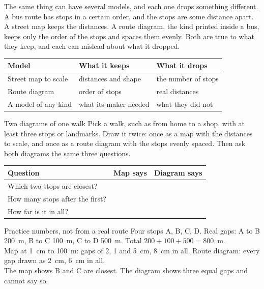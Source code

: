 \label{ch4}

The same thing can have several models, and each one drops something different. A bus route has stops in a certain order, and the stops are some distance apart. A street map keeps the distances. A route diagram, the kind printed inside a bus, keeps only the order of the stops and spaces them evenly. Both are true to what they keep, and each can mislead about what it dropped.

\begin{center}
\sffamily\small\renewcommand{\arraystretch}{1.5}
\begin{tabular}{@{}p{3.4cm}p{3.7cm}p{3.7cm}@{}}
\toprule
\textbf{Model} & \textbf{What it keeps} & \textbf{What it drops}\\
\midrule
Street map to scale & distances and shape & the number of stops\\
Route diagram & order of stops & real distances\\
A model of any kind & what its maker needed & what they did not\\
\bottomrule
\end{tabular}
\end{center}

\begin{tryit}{Two diagrams of one walk}
Pick a walk, such as from home to a shop, with at least three stops or landmarks. Draw it twice: once as a map with the distances to scale, and once as a route diagram with the stops evenly spaced. Then ask both diagrams the same three questions.\par\medskip
\renewcommand{\arraystretch}{1.8}
\begin{tabular}{|p{4.0cm}|p{2.5cm}|p{2.5cm}|}
\hline
\textbf{Question} & \textbf{Map says} & \textbf{Diagram says}\\ \hline
Which two stops are closest? & & \\ \hline
How many stops after the first? & & \\ \hline
How far is it in all? & & \\ \hline
\end{tabular}
\end{tryit}

\begin{worked}{Practice numbers, not from a real route}
Four stops A, B, C, D. Real gaps: A to B 200~m, B to C 100~m, C to D 500~m. Total $200+100+500=800$~m.\\
Map at 1~cm to 100~m: gaps of 2, 1 and 5~cm, 8~cm in all. Route diagram: every gap drawn as 2~cm, 6~cm in all.\\
The map shows B and C are closest. The diagram shows three equal gaps and cannot say so.
\end{worked}


